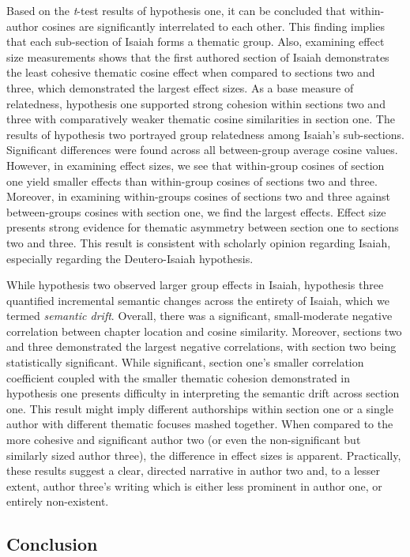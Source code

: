 \documentclass[english,man]{apa6}
\newcounter{author}
\theoremstyle{definition}
\theoremstyle{definition}
\theoremstyle{definition}
\theoremstyle{remark}
\begin{document}
Based on the \emph{t}-test results of hypothesis one, it can be
concluded that within-author cosines are significantly interrelated to
each other. This finding implies that each sub-section of Isaiah forms a
thematic group. Also, examining effect size measurements shows that the
first authored section of Isaiah demonstrates the least cohesive
thematic cosine effect when compared to sections two and three, which
demonstrated the largest effect sizes. As a base measure of relatedness,
hypothesis one supported strong cohesion within sections two and three
with comparatively weaker thematic cosine similarities in section one.
The results of hypothesis two portrayed group relatedness among Isaiah's
sub-sections. Significant differences were found across all
between-group average cosine values. However, in examining effect sizes,
we see that within-group cosines of section one yield smaller effects
than within-group cosines of sections two and three. Moreover, in
examining within-groups cosines of sections two and three against
between-groups cosines with section one, we find the largest effects.
Effect size presents strong evidence for thematic asymmetry between
section one to sections two and three. This result is consistent with
scholarly opinion regarding Isaiah, especially regarding the
Deutero-Isaiah hypothesis.

While hypothesis two observed larger group effects in Isaiah, hypothesis
three quantified incremental semantic changes across the entirety of
Isaiah, which we termed \emph{semantic drift}. Overall, there was a
significant, small-moderate negative correlation between chapter
location and cosine similarity. Moreover, sections two and three
demonstrated the largest negative correlations, with section two being
statistically significant. While significant, section one's smaller
correlation coefficient coupled with the smaller thematic cohesion
demonstrated in hypothesis one presents difficulty in interpreting the
semantic drift across section one. This result might imply different
authorships within section one or a single author with different
thematic focuses mashed together. When compared to the more cohesive and
significant author two (or even the non-significant but similarly sized
author three), the difference in effect sizes is apparent. Practically,
these results suggest a clear, directed narrative in author two and, to
a lesser extent, author three's writing which is either less prominent
in author one, or entirely non-existent.

\subsection{Conclusion}\label{conclusion}
\end{document}
